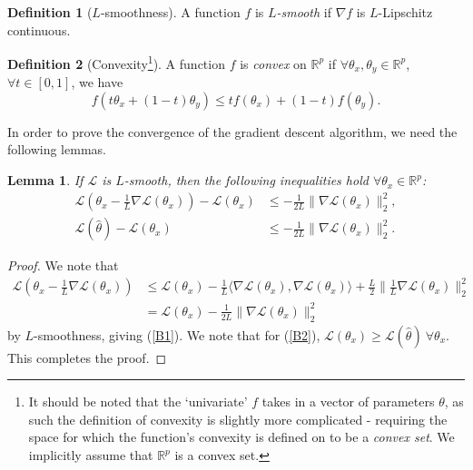 \documentclass[a4paper,11pt,titlepage]{article}
\theoremstyle{definition}
\newtheorem{definition}{Definition}[section]
\theoremstyle{plain}
\newtheorem{lemma}[theorem]{Lemma}
\theoremstyle{remark}
\begin{document}
\begin{definition}[$L$-smoothness]
    A function $f$ is $L$\textit{-smooth} if $\nabla f$ is $L$-Lipschitz continuous.
\end{definition}

\begin{definition}[Convexity\footnote{It should be noted that the `univariate' $f$ takes in a vector of parameters $\theta$, as such the definition of convexity is slightly more complicated - requiring the space for which the function's convexity is defined on to be a \textit{convex set}. We implicitly assume that $\mathbb{R}^p$ is a convex set.}]
    A function $f$ is \textit{convex} on $\mathbb{R}^p$ if $\forall \theta_x, \theta_y \in \mathbb{R}^p$, $\forall t \in [0, 1]$, we have
    $$
    f(t\theta_x + (1 - t)\theta_y) \leq tf(\theta_x) + (1-t)f(\theta_y).
    $$
\end{definition}

In order to prove the convergence of the gradient descent algorithm, we need the following lemmas.

\begin{lemma}
    If $\mathcal{L}$ is $L$-smooth, then the following inequalities hold $\forall  \theta_x \in \mathbb{R}^p$: 
    \begin{align}
        \mathcal{L}(\theta_x - \frac{1}{L}\nabla \mathcal{L}(\theta_x)) - \mathcal{L}(\theta_x) &\leq -\frac{1}{2L} \| \nabla \mathcal{L}(\theta_x)\|_2^2, \label{B1} \\
        \mathcal{L}(\hat{\theta}) - \mathcal{L}(\theta_x) &\leq -\frac{1}{2L}\|\nabla \mathcal{L}(\theta_x)\|_2^2. \label{B2}
    \end{align}
\end{lemma}
\begin{proof}
    We note that
    \begin{align*}
        \mathcal{L}(\theta_x - \frac{1}{L}\nabla \mathcal{L}(\theta_x)) &\leq \mathcal{L}(\theta_x) - \frac{1}{L} \langle\nabla \mathcal{L}(\theta_x), \nabla \mathcal{L}(\theta_x)\rangle + \frac{L}{2} \|\frac{1}{L}\nabla \mathcal{L}(\theta_x) \|_2^2 \\
        &= \mathcal{L}(\theta_x) - \frac{1}{2L}\| \nabla \mathcal{L}(\theta_x)\|_2^2
    \end{align*}
    by $L$-smoothness, giving (\ref{B1}). We note that for (\ref{B2}), $\mathcal{L}(\theta_x) \geq \mathcal{L}(\hat{\theta}) \ \forall \theta_x$. This completes the proof.
\end{proof}
\end{document}
